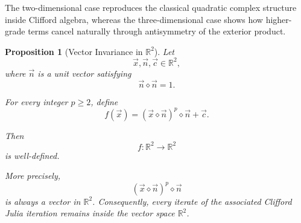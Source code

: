 \documentclass{amsart}
\theoremstyle{plain}
\newtheorem{proposition}{Proposition}
\numberwithin{equation}{section}
\begin{document}
The two-dimensional case reproduces the classical quadratic complex
structure inside Clifford algebra, whereas the three-dimensional case
shows how higher-grade terms cancel naturally through antisymmetry of
the exterior product.

\begin{proposition}[Vector Invariance in $\mathbb{R}^{2}$]
Let
\[
\vec{x},\vec{n},\vec{c}\in \mathbb{R}^{2},
\]
where $\vec n$ is a unit vector satisfying
\[
\vec n\diamond \vec n =1.
\]

For every integer $p\ge 2$, define
\[
f(\vec{x})
=
(\vec{x}\diamond \vec n)^p\diamond \vec n+\vec c.
\]

Then
\[
f:\mathbb{R}^{2}\to \mathbb{R}^{2}
\]
is well-defined.

More precisely,
\[
(\vec{x}\diamond \vec n)^p\diamond \vec n
\]
is always a vector in $\mathbb{R}^{2}$.
Consequently, every iterate of the associated Clifford Julia iteration
remains inside the vector space $\mathbb{R}^{2}$.
\end{proposition}
\end{document}
